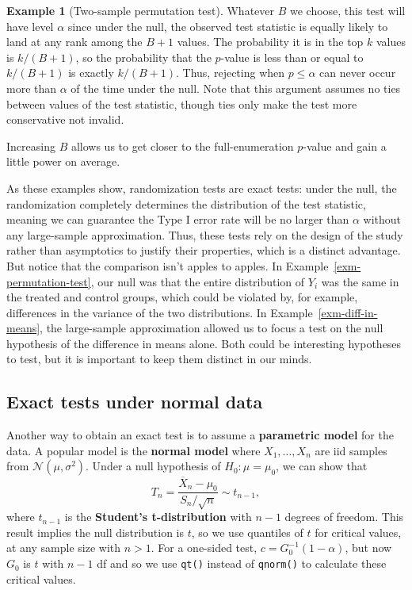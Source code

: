 \documentclass[
  13pt,
  letterpaper,
  DIV=11,
  numbers=noendperiod]{scrreprt}
\newcommand{\N}{\mathcal{N}}
\newcommand{\Xbar}{\overline{X}}
\theoremstyle{plain}
\theoremstyle{plain}
\theoremstyle{definition}
\theoremstyle{definition}
\newtheorem{example}{Example}[chapter]
\theoremstyle{remark}
\begin{document}
\begin{example}[Two-sample permutation
test]
Whatever \(B\) we choose, this test will have level \(\alpha\) since
under the null, the observed test statistic is equally likely to land at
any rank among the \(B+1\) values. The probability it is in the top
\(k\) values is \(k / (B+1)\), so the probability that the \(p\)-value
is less than or equal to \(k / (B+1)\) is exactly \(k/(B+1)\). Thus,
rejecting when \(p \leq \alpha\) can never occur more than \(\alpha\) of
the time under the null. Note that this argument assumes no ties between
values of the test statistic, though ties only make the test more
conservative not invalid.

Increasing \(B\) allows us to get closer to the full-enumeration
\(p\)-value and gain a little power on average.

\end{example}

As these examples show, randomization tests are exact tests: under the
null, the randomization completely determines the distribution of the
test statistic, meaning we can guarantee the Type I error rate will be
no larger than \(\alpha\) without any large-sample approximation. Thus,
these tests rely on the design of the study rather than asymptotics to
justify their properties, which is a distinct advantage. But notice that
the comparison isn't apples to apples. In
Example~\ref{exm-permutation-test}, our null was that the entire
distribution of \(Y_i\) was the same in the treated and control groups,
which could be violated by, for example, differences in the variance of
the two distributions. In Example~\ref{exm-diff-in-means}, the
large-sample approximation allowed us to focus a test on the null
hypothesis of the difference in means alone. Both could be interesting
hypotheses to test, but it is important to keep them distinct in our
minds.

\subsection{Exact tests under normal data}\label{sec-hyp-test-normal}

Another way to obtain an exact test is to assume a \textbf{parametric
model} for the data. A popular model is the \textbf{normal model} where
\(X_1,\ldots,X_n\) are iid samples from \(\N(\mu,\sigma^2)\). Under a
null hypothesis of \(H_0: \mu = \mu_0\), we can show that \[ 
T_n = \frac{\Xbar_n - \mu_0}{S_n/\sqrt{n}} \sim t_{n-1},
\] where \(t_{n-1}\) is the \textbf{Student's t-distribution} with
\(n-1\) degrees of freedom. This result implies the null distribution is
\(t\), so we use quantiles of \(t\) for critical values, at any sample
size with \(n > 1\). For a one-sided test, \(c = G^{-1}_0(1 - \alpha)\),
but now \(G_0\) is \(t\) with \(n-1\) df and so we use \texttt{qt()}
instead of \texttt{qnorm()} to calculate these critical values.
\end{document}
